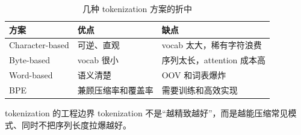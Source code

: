 \begin{table}[H]
\centering
\begin{tabular}{p{3cm}p{4cm}p{5.8cm}}
\toprule
\textbf{方案} & \textbf{优点} & \textbf{缺点} \\
\midrule
Character-based & 可逆、直观 & vocab 太大，稀有字符浪费 \\
Byte-based & vocab 很小 & 序列太长，attention 成本高 \\
Word-based & 语义清楚 & OOV 和词表爆炸 \\
BPE & 兼顾压缩率和覆盖率 & 需要训练和高效实现 \\
\bottomrule
\end{tabular}
\caption{几种 tokenization 方案的折中}
\end{table}

\begin{warningbox}{tokenization 的工程边界}
tokenization 不是“越精致越好”，而是越能压缩常见模式、同时不把序列长度拉爆越好。
\end{warningbox}

